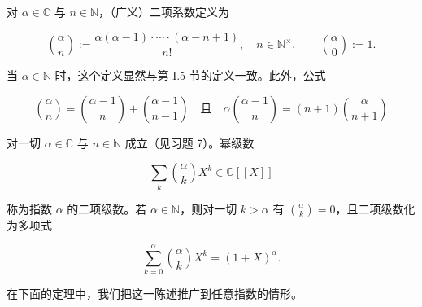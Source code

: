 对 $ \alpha \in \mathbb{C} $ 与 $ n \in \mathbb{N} $，（广义）二项系数定义为

\[
\binom{\alpha}{n}:=\frac{\alpha(\alpha-1)\cdot\cdots\cdot(\alpha-n+1)}{n!},\quad n\in\mathbb{N}^{\times},\qquad\binom{\alpha}{0}:=1.
\]

当 $ \alpha \in \mathbb{N} $ 时，这个定义显然与第 I.5 节的定义一致。此外，公式

\begin{equation}
\binom{\alpha}{n}=\binom{\alpha-1}{n}+\binom{\alpha-1}{n-1}\quad\text{且}\quad\alpha\binom{\alpha-1}{n}=(n+1)\binom{\alpha}{n+1}
\end{equation}

对一切 $ \alpha \in \mathbb{C} $ 与 $ n \in \mathbb{N} $ 成立（见习题 7）。幂级数

\[
\sum_{k}\binom{\alpha}{k}X^{k}\in\mathbb{C}[\![X]\!]
\]

称为指数 $ \alpha $ 的二项级数。若 $ \alpha \in \mathbb{N} $，则对一切 $ k > \alpha $ 有 $ \binom{\alpha}{k} = 0 $，且二项级数化为多项式

\[
\sum_{k=0}^{\alpha}\binom{\alpha}{k}X^{k}=(1+X)^{\alpha}.
\]

在下面的定理中，我们把这一陈述推广到任意指数的情形。

